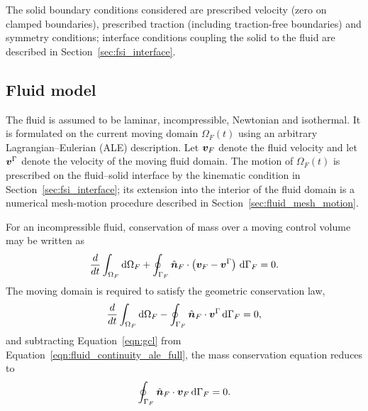 The solid boundary conditions considered are prescribed velocity (zero on clamped boundaries), prescribed traction (including traction-free boundaries) and symmetry conditions; interface conditions coupling the solid to the fluid are described in Section~\ref{sec:fsi_interface}.


\subsection{Fluid model}
\label{sec:fluid_governing_eqn}

The fluid is assumed to be laminar, incompressible, Newtonian and isothermal.
It is formulated on the current moving domain $\Omega_F(t)$ using an arbitrary Lagrangian--Eulerian (ALE) description.
Let $\boldsymbol{v}_F$ denote the fluid velocity and let $\boldsymbol{v}^{\Gamma}$ denote the velocity of the moving fluid domain.
The motion of $\Omega_F(t)$ is prescribed on the fluid--solid interface by the kinematic condition in Section~\ref{sec:fsi_interface}; its extension into the interior of the fluid domain is a numerical mesh-motion procedure described in Section~\ref{sec:fluid_mesh_motion}.

For an incompressible fluid, conservation of mass over a moving control volume may be written as
\begin{equation}
    \frac{d}{dt}
    \int_{\Omega_F}
    \text{d}\Omega_F
    +
    \oint_{\Gamma_F}
    \hat{\boldsymbol{n}}_F
    \cdot
    \left(
    \boldsymbol{v}_F - \boldsymbol{v}^{\Gamma}
    \right)
    \, \text{d}\Gamma_F
    =
    0 .
    \label{eqn:fluid_continuity_ale_full}
\end{equation}
The moving domain is required to satisfy the geometric conservation law,
\begin{equation}
    \frac{d}{dt}
    \int_{\Omega_F}
    \text{d}\Omega_F
    -
    \oint_{\Gamma_F}
    \hat{\boldsymbol{n}}_F
    \cdot
    \boldsymbol{v}^{\Gamma}
    \, \text{d}\Gamma_F
    =
    0 ,
    \label{eqn:gcl}
\end{equation}
and subtracting Equation~\eqref{eqn:gcl} from Equation~\eqref{eqn:fluid_continuity_ale_full}, the mass conservation equation reduces to
\begin{equation}
    \oint_{\Gamma_F}
    \hat{\boldsymbol{n}}_F
    \cdot
    \boldsymbol{v}_F
    \, \text{d}\Gamma_F
    =
    0 .
    \label{eqn:fluid_continuity_ale}
\end{equation}

